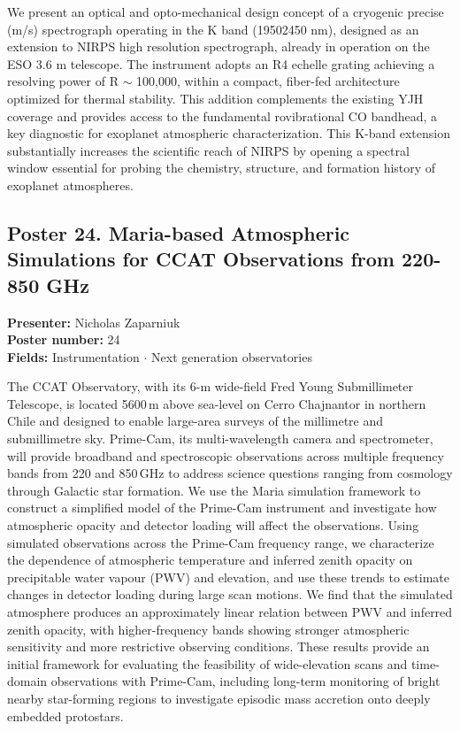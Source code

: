 We present an optical and opto-mechanical design concept of a cryogenic precise (m/s) spectrograph operating in the K band (19502450 nm), designed as an extension to NIRPS high resolution spectrograph, already in operation on the ESO 3.6 m telescope. The instrument adopts an R4 echelle grating achieving a resolving power of R $\sim$ 100,000, within a compact, fiber-fed architecture optimized for thermal stability. This addition complements the existing YJH coverage and provides access to the fundamental rovibrational CO bandhead, a key diagnostic for exoplanet atmospheric characterization. This K-band extension substantially increases the scientific reach of NIRPS by opening a spectral window essential for probing the chemistry, structure, and formation history of exoplanet atmospheres.


\hypertarget{poster-abstract-talk-337}{}\label{poster-abstract-page-talk-337}
\subsection*{Poster 24. Maria-based Atmospheric Simulations for CCAT Observations from 220-850 GHz}
\textbf{Presenter:} Nicholas Zaparniuk\\
\textbf{Poster number:} 24\\
\textbf{Fields:} Instrumentation $\cdot$ Next generation observatories

The CCAT Observatory, with its 6-m wide-field Fred Young Submillimeter Telescope, is located 5600\,m above sea-level on Cerro Chajnantor in northern Chile and designed to enable large-area surveys of the millimetre and submillimetre sky. Prime-Cam, its multi-wavelength camera and spectrometer, will provide broadband and spectroscopic observations across multiple frequency bands from 220 and 850\,GHz to address science questions ranging from cosmology through Galactic star formation. We use the Maria simulation framework to construct a simplified model of the Prime-Cam instrument and investigate how atmospheric opacity and detector loading will affect the observations. Using simulated observations across the Prime-Cam frequency range, we characterize the dependence of atmospheric temperature and inferred zenith opacity on precipitable water vapour (PWV) and elevation, and use these trends to estimate changes in detector loading during large scan motions. We find that the simulated atmosphere produces an approximately linear relation between PWV and inferred zenith opacity, with higher-frequency bands showing stronger atmospheric sensitivity and more restrictive observing conditions. These results provide an initial framework for evaluating the feasibility of wide-elevation scans and time-domain observations with Prime-Cam, including long-term monitoring of bright nearby star-forming regions to investigate episodic mass accretion onto deeply embedded protostars.

